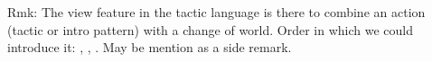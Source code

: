 Rmk: The view feature in the tactic language is there to combine an
action (tactic or intro pattern) with a change of world. Order in
which we could introduce it: , ,
. May be mention  as a side remark.













